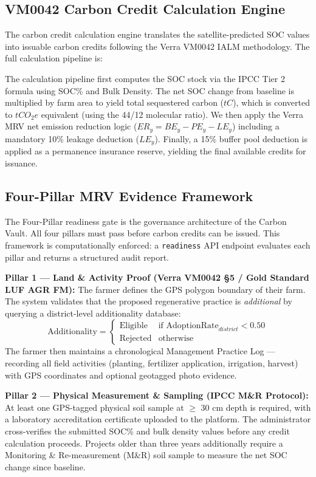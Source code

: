 \documentclass[10pt,a4paper]{article}
\begin{document}
\subsection{VM0042 Carbon Credit Calculation Engine}
The carbon credit calculation engine translates the satellite-predicted SOC values into issuable carbon credits following the Verra VM0042 IALM methodology. The full calculation pipeline is:

The calculation pipeline first computes the SOC stock via the IPCC Tier 2 formula using SOC\% and Bulk Density. The net SOC change from baseline is multiplied by farm area to yield total sequestered carbon ($tC$), which is converted to $tCO_2e$ equivalent (using the 44/12 molecular ratio). We then apply the Verra MRV net emission reduction logic ($ER_y = BE_y - PE_y - LE_y$) including a mandatory 10\% leakage deduction ($LE_y$). Finally, a 15\% buffer pool deduction is applied as a permanence insurance reserve, yielding the final available credits for issuance.

\subsection{Four-Pillar MRV Evidence Framework}
The Four-Pillar readiness gate is the governance architecture of the Carbon Vault. All four pillars must pass before carbon credits can be issued. This framework is computationally enforced: a \texttt{readiness} API endpoint evaluates each pillar and returns a structured audit report.

\textbf{Pillar 1 — Land \& Activity Proof (Verra VM0042 \S5 / Gold Standard LUF AGR FM):}
The farmer defines the GPS polygon boundary of their farm. The system validates that the proposed regenerative practice is \textit{additional} by querying a district-level additionality database:
\begin{equation}
    \text{Additionality} = \begin{cases} \text{Eligible} & \text{if } \text{AdoptionRate}_{district} < 0.50 \\ \text{Rejected} & \text{otherwise} \end{cases}
\end{equation}
The farmer then maintains a chronological Management Practice Log — recording all field activities (planting, fertilizer application, irrigation, harvest) with GPS coordinates and optional geotagged photo evidence.

\textbf{Pillar 2 — Physical Measurement \& Sampling (IPCC M\&R Protocol):}
At least one GPS-tagged physical soil sample at $\geq$ 30 cm depth is required, with a laboratory accreditation certificate uploaded to the platform. The administrator cross-verifies the submitted SOC\% and bulk density values before any credit calculation proceeds. Projects older than three years additionally require a Monitoring \& Re-measurement (M\&R) soil sample to measure the net SOC change since baseline.
\end{document}
